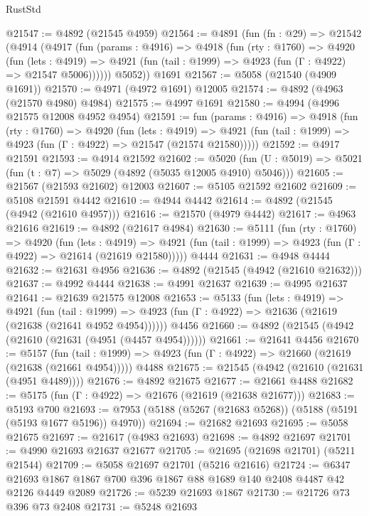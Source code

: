 \begin{lexlean}{RustStd}
\begin{coremodule}
@21547 := @4892 (@21545 @4959)
@21564 := @4891
    (fun (fn : @29) =>
    @21542
      (@4914
        (@4917
          (fun (params : @4916) =>
          @4918
            (fun (rty : @1760) =>
            @4920
              (fun (lets : @4919) =>
              @4921 (fun (tail : @1999) => @4923 (fun (Γ : @4922) => @21547 @5006))))))
        @5052))
    @1691
@21567 := @5058 (@21540 (@4909 @1691))
@21570 := @4971 (@4972 @1691) @12005
@21574 := @4892 (@4963 (@21570 @4980) @4984)
@21575 := @4997 @1691
@21580 := @4994 (@4996 @21575 @12008 @4952 @4954)
@21591 := fun (params : @4916) =>
  @4918
    (fun (rty : @1760) =>
    @4920
      (fun (lets : @4919) =>
      @4921 (fun (tail : @1999) => @4923 (fun (Γ : @4922) => @21547 (@21574 @21580)))))
@21592 := @4917 @21591
@21593 := @4914 @21592
@21602 := @5020
    (fun (U : @5019) => @5021 (fun (t : @7) => @5029 (@4892 (@5035 @12005 @4910) @5046)))
@21605 := @21567 (@21593 @21602) @12003
@21607 := @5105 @21592 @21602
@21609 := @5108 @21591 @4442
@21610 := @4944 @4442
@21614 := @4892 (@21545 (@4942 (@21610 @4957)))
@21616 := @21570 (@4979 @4442)
@21617 := @4963 @21616
@21619 := @4892 (@21617 @4984)
@21630 := @5111
    (fun (rty : @1760) =>
    @4920
      (fun (lets : @4919) =>
      @4921 (fun (tail : @1999) => @4923 (fun (Γ : @4922) => @21614 (@21619 @21580)))))
    @4444
@21631 := @4948 @4444
@21632 := @21631 @4956
@21636 := @4892 (@21545 (@4942 (@21610 @21632)))
@21637 := @4992 @4444
@21638 := @4991 @21637
@21639 := @4995 @21637
@21641 := @21639 @21575 @12008
@21653 := @5133
    (fun (lets : @4919) =>
    @4921
      (fun (tail : @1999) =>
      @4923 (fun (Γ : @4922) => @21636 (@21619 (@21638 (@21641 @4952 @4954))))))
    @4456
@21660 := @4892 (@21545 (@4942 (@21610 (@21631 (@4951 (@4457 @4954))))))
@21661 := @21641 @4456
@21670 := @5157
    (fun (tail : @1999) => @4923 (fun (Γ : @4922) => @21660 (@21619 (@21638 (@21661 @4954)))))
    @4488
@21675 := @21545 (@4942 (@21610 (@21631 (@4951 @4489))))
@21676 := @4892 @21675
@21677 := @21661 @4488
@21682 := @5175 (fun (Γ : @4922) => @21676 (@21619 (@21638 @21677)))
@21683 := @5193 @700
@21693 := @7953 (@5188 (@5267 (@21683 @5268)) (@5188 (@5191 (@5193 @1677 @5196)) @4970))
@21694 := @21682 @21693
@21695 := @5058 @21675
@21697 := @21617 (@4983 @21693)
@21698 := @4892 @21697
@21701 := @4990 @21693 @21637 @21677
@21705 := @21695 (@21698 @21701) (@5211 @21544)
@21709 := @5058 @21697 @21701 (@5216 @21616)
@21724 := @6347 @21693 @1867 @1867 @700 @396 @1867 @88 @1689 @140 @2408 @4487 @42 @2126 @4449 @2089
@21726 := @5239 @21693 @1867
@21730 := @21726 @73 @396 @73 @2408
@21731 := @5248 @21693

\end{coremodule}
\end{lexlean}

